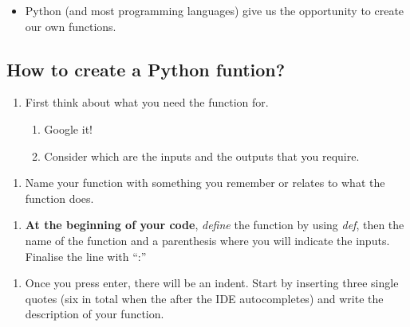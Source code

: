\documentclass[11pt]{article}
\providecommand{\tightlist}{%
      \setlength{\itemsep}{0pt}\setlength{\parskip}{0pt}}
\begin{document}
    \begin{itemize}
\tightlist
\item
  Python (and most programming languages) give us the opportunity to
  create our own functions.
\end{itemize}

    \hypertarget{how-to-create-a-python-funtion}{%
\subsection{How to create a Python
funtion?}\label{how-to-create-a-python-funtion}}

    \begin{enumerate}
\def\labelenumi{\arabic{enumi}.}
\tightlist
\item
  First think about what you need the function for.

  \begin{enumerate}
  \def\labelenumii{\arabic{enumii}.}
  \tightlist
  \item
    Google it!
  \item
    Consider which are the inputs and the outputs that you require.
  \end{enumerate}
\end{enumerate}

    \begin{enumerate}
\def\labelenumi{\arabic{enumi}.}
\setcounter{enumi}{1}
\tightlist
\item
  Name your function with something you remember or relates to what the
  function does.
\end{enumerate}

    \begin{enumerate}
\def\labelenumi{\arabic{enumi}.}
\setcounter{enumi}{2}
\tightlist
\item
  \textbf{At the beginning of your code}, \emph{define} the function by
  using \emph{def}, then the name of the function and a parenthesis
  where you will indicate the inputs. Finalise the line with ``:''
\end{enumerate}

    \begin{enumerate}
\def\labelenumi{\arabic{enumi}.}
\setcounter{enumi}{3}
\tightlist
\item
  Once you press enter, there will be an indent. Start by inserting
  three single quotes (six in total when the after the IDE
  autocompletes) and write the description of your function.
\end{enumerate}
\end{document}
